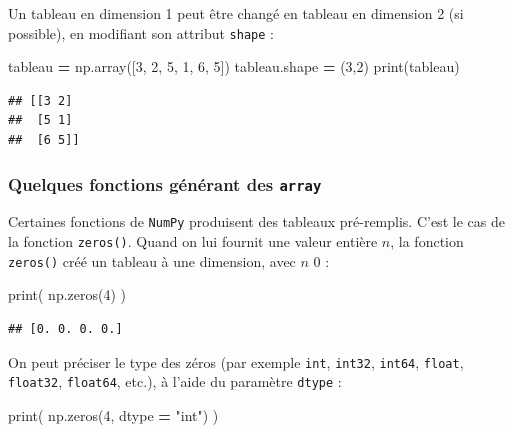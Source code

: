 \documentclass[12pt,]{book}
\newenvironment{Shaded}{\begin{snugshade}}{\end{snugshade}}
\newcommand{\DecValTok}[1]{\textcolor[rgb]{0.00,0.00,0.81}{#1}}
\newcommand{\StringTok}[1]{\textcolor[rgb]{0.31,0.60,0.02}{#1}}
\newcommand{\OperatorTok}[1]{\textcolor[rgb]{0.81,0.36,0.00}{\textbf{#1}}}
\newcommand{\BuiltInTok}[1]{#1}
\newcommand{\NormalTok}[1]{#1}
\numberwithin{equation}{section}
\numberwithin{countremarque}{section}
\begin{document}
Un tableau en dimension 1 peut être changé en tableau en dimension 2 (si
possible), en modifiant son attribut \texttt{shape} :

\begin{Shaded}
\begin{Highlighting}[]
\NormalTok{tableau }\OperatorTok{=}\NormalTok{ np.array([}\DecValTok{3}\NormalTok{, }\DecValTok{2}\NormalTok{, }\DecValTok{5}\NormalTok{, }\DecValTok{1}\NormalTok{, }\DecValTok{6}\NormalTok{, }\DecValTok{5}\NormalTok{])}
\NormalTok{tableau.shape }\OperatorTok{=}\NormalTok{ (}\DecValTok{3}\NormalTok{,}\DecValTok{2}\NormalTok{)}
\BuiltInTok{print}\NormalTok{(tableau)}
\end{Highlighting}
\end{Shaded}

\begin{lstlisting}
## [[3 2]
##  [5 1]
##  [6 5]]
\end{lstlisting}

\subsubsection{\texorpdfstring{Quelques fonctions générant des
\texttt{array}}{Quelques fonctions générant des array}}\label{quelques-fonctions-generant-des-array}

Certaines fonctions de \texttt{NumPy} produisent des tableaux
pré-remplis. C'est le cas de la fonction \texttt{zeros()}. Quand on lui
fournit une valeur entière \(n\), la fonction \texttt{zeros()} créé un
tableau à une dimension, avec \(n\) 0 :

\begin{Shaded}
\begin{Highlighting}[]
\BuiltInTok{print}\NormalTok{( np.zeros(}\DecValTok{4}\NormalTok{) )}
\end{Highlighting}
\end{Shaded}

\begin{lstlisting}
## [0. 0. 0. 0.]
\end{lstlisting}

On peut préciser le type des zéros (par exemple \texttt{int},
\texttt{int32}, \texttt{int64}, \texttt{float}, \texttt{float32},
\texttt{float64}, etc.), à l'aide du paramètre \texttt{dtype} :

\begin{Shaded}
\begin{Highlighting}[]
\BuiltInTok{print}\NormalTok{( np.zeros(}\DecValTok{4}\NormalTok{, dtype }\OperatorTok{=} \StringTok{"int"}\NormalTok{) )}
\end{Highlighting}
\end{Shaded}
\end{document}
